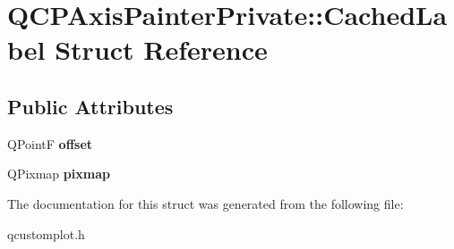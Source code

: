 \hypertarget{structQCPAxisPainterPrivate_1_1CachedLabel}{}\section{Q\+C\+P\+Axis\+Painter\+Private\+:\+:Cached\+Label Struct Reference}
\label{structQCPAxisPainterPrivate_1_1CachedLabel}
\subsection*{Public Attributes}
\begin{DoxyCompactItemize}
\item 
Q\+PointF {\bfseries offset}\hypertarget{structQCPAxisPainterPrivate_1_1CachedLabel_a5f502db71c92e572f1e6f44f62c59d8e}{}\label{structQCPAxisPainterPrivate_1_1CachedLabel_a5f502db71c92e572f1e6f44f62c59d8e}

\item 
Q\+Pixmap {\bfseries pixmap}\hypertarget{structQCPAxisPainterPrivate_1_1CachedLabel_a461597cbd470914a9d24b64d16037a88}{}\label{structQCPAxisPainterPrivate_1_1CachedLabel_a461597cbd470914a9d24b64d16037a88}

\end{DoxyCompactItemize}


The documentation for this struct was generated from the following file\+:\begin{DoxyCompactItemize}
\item 
qcustomplot.\+h\end{DoxyCompactItemize}
